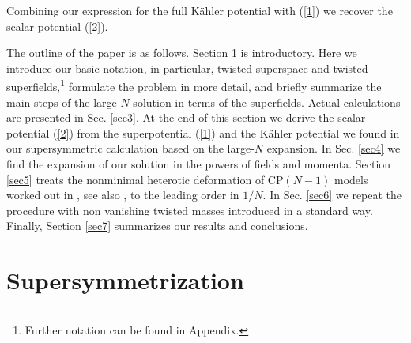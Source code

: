 \documentclass[epsfig,12pt]{article}
\begin{document}
Combining our expression for the full  K\"ahler potential with (\ref{1}) we recover the scalar potential (\ref{2}). 

The outline of the paper is as follows. Section \ref{sec2} is introductory.
Here we introduce our basic notation, in particular, twisted superspace and twisted superfields,\footnote{Further notation can be found in Appendix.} formulate the problem in more detail, and briefly summarize the main steps of the 
large-$N$ solution in terms of the superfields. Actual calculations are presented in Sec. \ref{sec3}. 
At the end of this section we derive the scalar potential (\ref{2}) from the superpotential (\ref{1}) and the K\"ahler potential we found in our supersymmetric calculation based on the large-$N$ expansion.
In Sec. \ref{sec4} we find the expansion of our solution in the powers of fields and momenta. Section \ref{sec5} treats the nonminimal heterotic deformation of CP$(N-1)$ models worked out in \cite{EdTo,SY1}, see also \cite{SYhet,BSYhet,BSY1}, to the leading order in $1/N$. In Sec. \ref{sec6} we repeat the procedure with non vanishing twisted masses introduced in a standard way. Finally, Section \ref{sec7} summarizes our results and conclusions.


\newpage


\section{Supersymmetrization}
\label{sec2}
\end{document}
